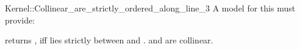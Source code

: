 \begin{ccRefFunctionObjectConcept}{Kernel::Collinear_are_strictly_ordered_along_line_3}
A model for this must provide:


         {returns , iff  lies strictly between 
          and . \ccPrecond {} and 
          are collinear.}

\end{ccRefFunctionObjectConcept}
